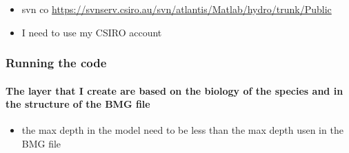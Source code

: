 \documentclass[11pt]{article}
\begin{document}
\begin{itemize}
\item svn co \href{https://svnserv.csiro.au/svn/atlantis/Matlab/hydro/trunk/Public}{https://svnserv.csiro.au/svn/atlantis/Matlab/hydro/trunk/Public}
\item I need to use my CSIRO account
\end{itemize}
\subsubsection*{Running the code}
\label{sec-4-3-2}
\paragraph*{The layer that I create are based on the biology of the species and in the structure of the BMG file}
\label{sec-4-3-2-1}

\begin{itemize}
\item the max depth in the model need to be less than the max depth usen in the BMG file
\end{itemize}
\end{document}
